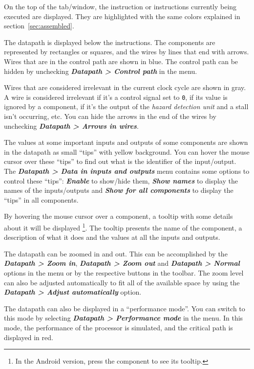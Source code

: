 \documentclass[11pt,a4paper,twoside,titlepage]{article}
\newcommand{\menupath}[1]{\textbf{\emph{#1}}}
\begin{document}
On the top of the tab/window, the instruction or instructions currently 
being executed are displayed. They are highlighted with the same colors
explained in section~\ref{sec:assembled}.

The datapath is displayed below the instructions.
The components are represented by rectangles or squares, and the wires by
lines that end with arrows.
Wires that are in the control path are shown in blue.
The control path can be hidden by unchecking
\menupath{Datapath > Control path} in the menu.

Wires that are considered irrelevant in the current clock cycle are shown
in gray.
A wire is considered irrelevant if it's a control signal set to \verb+0+,
if its value is ignored by a component, if it's the output of the
\emph{hazard detection unit} and a stall isn't occurring, etc.
You can hide the arrows in the end of the wires by unchecking
\menupath{Datapath > Arrows in wires}.

The values at some important inputs and outputs of some components are
shown in the datapath as small ``tips'' with yellow background.
You can hover the mouse cursor over these ``tips'' to find out what
is the identifier of the input/output.
The \menupath{Datapath > Data in inputs and outputs} menu contains some
options to control these ``tips'': \menupath{Enable} to show/hide them,
\menupath{Show names} to display the names of the inputs/outputs and
\menupath{Show for all components} to display the ``tips'' in all components.

By hovering the mouse cursor over a component, a tooltip with some details
about it will be displayed \footnote{In the Android version, press the 
component to see its tooltip.}.
The tooltip presents the name of the component, a description of what it
does and the values at all the inputs and outputs.

The datapath can be zoomed in and out. This can be accomplished by the
\menupath{Datapath > Zoom in}, \menupath{Datapath > Zoom out} and
\menupath{Datapath > Normal} options in the menu or by the respective
buttons in the toolbar.
The zoom level can also be adjusted automatically to fit all of the
available space by using the \menupath{Datapath > Adjust automatically}
option.


\bigskip

The datapath can also be displayed in a ``performance mode''. You can
switch to this mode by selecting \menupath{Datapath > Performance mode}
in the menu.
In this mode, the performance of the processor is simulated, and the
critical path is displayed in red.
\end{document}
